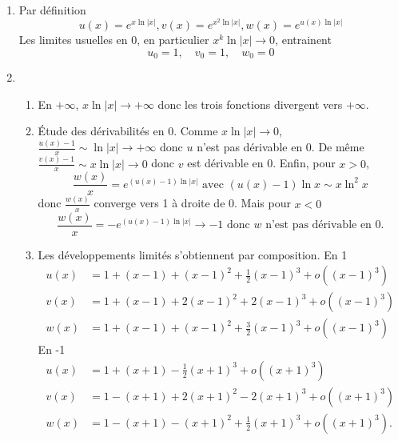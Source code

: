 \begin{enumerate}
\item Par définition 
\[u(x)=e^{x\ln |x|}, v(x)=e^{x^{2}\ln |x|}, w(x)=e^{u(x)\ln |x|}\]
Les limites usuelles en 0, en particulier $x^{k}\ln |x|\rightarrow 0$, entrainent
\[u_{0}=1,\quad v_{0}=1,\quad w_{0}=0\] 
\item\begin{enumerate}
\item En $+\infty$, $x\ln |x|\rightarrow +\infty$ donc les trois fonctions divergent vers $+\infty$.
\item \'{E}tude des dérivabilités en 0. \newline
Comme $x\ln |x|\rightarrow 0$, $\frac{u(x)-1}{x}\sim \ln |x|\rightarrow +\infty$  donc $u$ n'est pas dérivable en 0.\newline
De même $\frac{v(x)-1}{x}\sim x\ln |x|\rightarrow 0$ donc $v$ est dérivable en 0.\newline
Enfin, pour $x>0$,
\[
\frac{w(x)}{x}=e^{(u(x)-1)\ln |x|} \text{ avec } (u(x)-1)\ln x\sim x \ln^{2} x
\]
donc $\frac{w(x)}{x}$ converge vers 1 à droite de 0. Mais pour $x<0$
\[
\frac{w(x)}{x}=- e^{(u(x)-1)\ln |x|}\rightarrow -1 \text{ donc $w$ n'est pas dérivable en 0.}
\]

\item Les développements limités s'obtiennent par composition.
\newline En 1
\begin{align*}
u(x) &= 1 + (x-1) + (x-1)^{2} + \frac{1}{2}(x-1)^{3} + o((x-1)^{3})\\
v(x) &= 1 + (x-1) + 2(x-1)^{2} + 2(x-1)^{3} + o((x-1)^{3})\\
w(x) &= 1 + (x-1) + (x-1)^{2} + \frac{3}{2}(x-1)^{3} + o((x-1)^{3})
\end{align*}
En -1
\begin{align*}
u(x) &= 1 + (x+1) - \frac{1}{2}(x+1)^{3} + o((x+1)^{3})\\
v(x) &= 1 -(x+1) + 2(x+1)^{2} - 2(x+1)^{3} + o((x+1)^{3})\\
w(x) &= 1 -(x+1) - (x+1)^{2} + \frac{1}{2}(x+1)^{3} + o((x+1)^{3}).
\end{align*}
\end{enumerate}

\end{enumerate}


